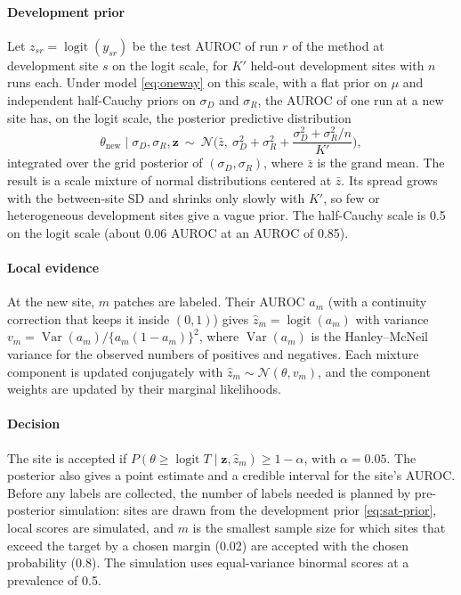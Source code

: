 \paragraph{Development prior} Let $z_{sr}=\operatorname{logit}(y_{sr})$ be the
test AUROC of run $r$ of the method at development site $s$ on the logit scale,
for $K'$ held-out development sites with $n$ runs each. Under model
\eqref{eq:oneway} on this scale, with a flat prior on $\mu$ and independent
half-Cauchy priors on $\sigma_D$ and $\sigma_R$, the AUROC of one run at a new
site has, on the logit scale, the posterior predictive distribution
\begin{equation}
  \theta_{\text{new}}\mid\sigma_D,\sigma_R,\mathbf z\ \sim\
  \mathcal N\!\Big(\bar z,\ \sigma_D^2+\sigma_R^2+\frac{\sigma_D^2+\sigma_R^2/n}{K'}\Big),
  \label{eq:sat-prior}
\end{equation}
integrated over the grid posterior of $(\sigma_D,\sigma_R)$, where $\bar z$ is
the grand mean. The result is a scale mixture of normal distributions centered
at $\bar z$. Its spread grows with the between-site SD and shrinks only slowly
with $K'$, so few or heterogeneous development sites give a vague prior. The
half-Cauchy scale is 0.5 on the logit scale (about 0.06 AUROC at an AUROC of
0.85).

\paragraph{Local evidence} At the new site, $m$ patches are labeled. Their AUROC
$a_m$ (with a continuity correction that keeps it inside $(0,1)$) gives
$\hat z_m=\operatorname{logit}(a_m)$ with variance
$v_m=\operatorname{Var}(a_m)/\{a_m(1-a_m)\}^2$, where $\operatorname{Var}(a_m)$
is the Hanley--McNeil variance for the observed numbers of positives and
negatives. Each mixture component is updated conjugately with
$\hat z_m\sim\mathcal N(\theta,v_m)$, and the component weights are updated by
their marginal likelihoods.

\paragraph{Decision} The site is accepted if
$P(\theta\ge\operatorname{logit}T\mid\mathbf z,\hat z_m)\ge 1-\alpha$, with
$\alpha=0.05$. The posterior also gives a point estimate and a credible interval
for the site's AUROC. Before any labels are collected, the number of labels
needed is planned by pre-posterior simulation: sites are drawn from the
development prior \eqref{eq:sat-prior}, local scores are simulated, and $m$ is
the smallest sample size for which sites that exceed the target by a chosen
margin (0.02) are accepted with the chosen probability (0.8). The simulation
uses equal-variance binormal scores at a prevalence of 0.5.

